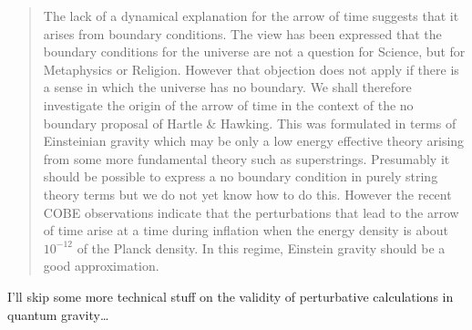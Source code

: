 \documentclass[12pt]{article}
\begin{document}
\begin{quote}
The lack of a dynamical explanation for the arrow of time suggests that
it arises from boundary conditions. The view has been expressed that the
boundary conditions for the universe are not a question for Science, but
for Metaphysics or Religion. However that objection does not apply if
there is a sense in which the universe has no boundary. We shall
therefore investigate the origin of the arrow of time in the context of
the no boundary proposal of Hartle \& Hawking. This was formulated in
terms of Einsteinian gravity which may be only a low energy effective
theory arising from some more fundamental theory such as superstrings.
Presumably it should be possible to express a no boundary condition in
purely string theory terms but we do not yet know how to do this.
However the recent COBE observations indicate that the perturbations
that lead to the arrow of time arise at a time during inflation when the
energy density is about \(10^{-12}\) of the Planck density. In this
regime, Einstein gravity should be a good approximation.

\end{quote}

\noindent
I'll skip some more technical stuff on the validity of perturbative
calculations in quantum gravity\ldots
\end{document}
